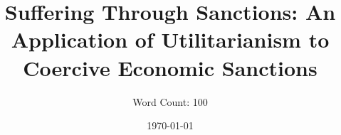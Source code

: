 \documentclass[12pt]{article}
\title{Suffering Through Sanctions: An Application of Utilitarianism to Coercive Economic Sanctions}
\author{Word Count: 100}
\date{\today}
\begin{document}
\maketitle

\Blindtext{}

\end{document}
